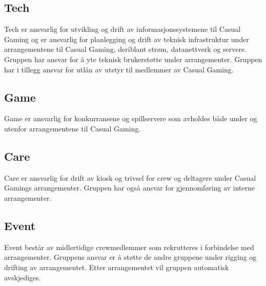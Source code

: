 \subsection{Tech}
Tech er ansvarlig for utvikling og drift av informasjonssystemene til Casual Gaming og er ansvarlig for planlegging og drift av teknisk infrastruktur under arrangementene til Casual Gaming, deriblant strøm, datanettverk og servere. Gruppen har ansvar for å yte teknisk brukerstøtte under arrangementer. Gruppen har i tillegg ansvar for utlån av utstyr til medlemmer av Casual Gaming.

\subsection{Game}
Game er ansvarlig for konkurransene og spillservere som avholdes både under og utenfor arrangementene til Casual Gaming.

\subsection{Care}
Care er ansvarlig for drift av kiosk og trivsel for crew og deltagere under Casual Gamings arrangementer. Gruppen har også ansvar for gjennomføring av interne arrangementer.

\subsection{Event}
Event består av midlertidige crewmedlemmer som rekrutteres i forbindelse med arrangementer. Gruppens ansvar er å støtte de andre gruppene under rigging og drifting av arrangementet. Etter arrangementet vil gruppen automatisk avskjediges.
